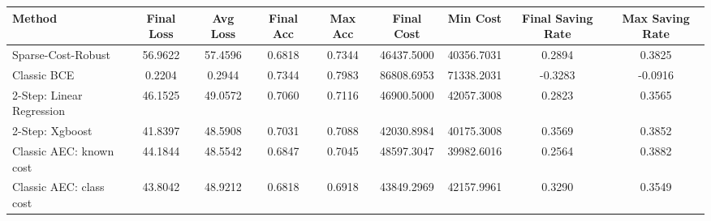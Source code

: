 \begin{tabular}{lcccccccc}
\toprule
Method & Final Loss & Avg Loss & Final Acc & Max Acc & Final Cost & Min Cost & Final Saving Rate & Max Saving Rate \\
\midrule
Sparse-Cost-Robust & 56.9622 & 57.4596 & 0.6818 & 0.7344 & 46437.5000 & 40356.7031 & 0.2894 & 0.3825 \\
Classic BCE & 0.2204 & 0.2944 & 0.7344 & 0.7983 & 86808.6953 & 71338.2031 & -0.3283 & -0.0916 \\
2-Step: Linear Regression & 46.1525 & 49.0572 & 0.7060 & 0.7116 & 46900.5000 & 42057.3008 & 0.2823 & 0.3565 \\
2-Step: Xgboost & 41.8397 & 48.5908 & 0.7031 & 0.7088 & 42030.8984 & 40175.3008 & 0.3569 & 0.3852 \\
Classic AEC: known cost & 44.1844 & 48.5542 & 0.6847 & 0.7045 & 48597.3047 & 39982.6016 & 0.2564 & 0.3882 \\
Classic AEC: class cost & 43.8042 & 48.9212 & 0.6818 & 0.6918 & 43849.2969 & 42157.9961 & 0.3290 & 0.3549 \\
\bottomrule
\end{tabular}
